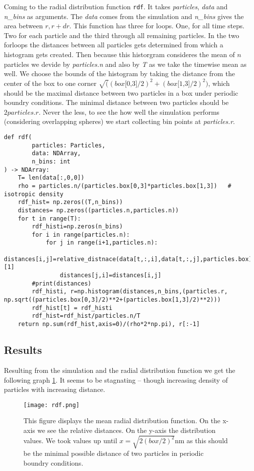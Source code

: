 \documentclass{article}[a4paper]
\begin{document}
Coming to the radial distribution function \texttt{rdf}. 
It takes \textit{particles}, \textit{data} and \textit{n\_bins} as arguments. 
The \textit{data} comes from the simulation and \textit{n\_bins} gives the area between $r, r+dr$. 
This function has three for loops. 
One, for all time steps. 
Two for each particle and the third through all remaining particles.
In the two forloops the distances between all particles gets determined from which a histogram gets created. 
Then because this historgram consideres the mean of $n$ particles we devide by \textit{particles.n} and also by \textit{T} as we take the timewise mean as well. 
We choose the bounds of the histogram by taking the distance from the center of the box to one corner $\sqrt((\textit{box[0,3]}/2)^2+(\textit{box[1,3]}/2)^2)$, which should be the maximal distance between two particles in a box under periodic boundry conditions.
The minimal distance between two particles should be $2\textit{particles.r}$.
Never the less, to see the how well the simulation performs (considering overlapping spheres) we start collecting bin points at \textit{particles.r}.

\begin{lstlisting}
def rdf(
        particles: Particles,
        data: NDArray,
        n_bins: int
) -> NDArray:
    T= len(data[:,0,0])
    rho = particles.n/(particles.box[0,3]*particles.box[1,3])   # isotropic density
    rdf_hist= np.zeros((T,n_bins))
    distances= np.zeros((particles.n,particles.n))
    for t in range(T):
        rdf_histi=np.zeros(n_bins)
        for i in range(particles.n):
            for j in range(i+1,particles.n):
                distances[i,j]=relative_distnace(data[t,:,i],data[t,:,j],particles.box)[1]
                distances[j,i]=distances[i,j]
        #print(distances)
        rdf_histi, r=np.histogram(distances,n_bins,(particles.r, np.sqrt((particles.box[0,3]/2)**2+(particles.box[1,3]/2)**2)))
        rdf_hist[t] = rdf_histi
        rdf_hist=rdf_hist/particles.n/T
    return np.sum(rdf_hist,axis=0)/(rho*2*np.pi), r[:-1]
\end{lstlisting}

\subsection{Results}
Resulting from the simulation and the radial distribution function we get the following graph \ref{fig:rdf}.
It seems to be stagnating -- though increasing density of particles with increasing distance.
\begin{figure}[h!]
    \centering
    \texttt{[image: rdf.png]}
    \caption{This figure displays the mean radial distribution function. On the x-axis we see the relative distances. On the y-axis the distribution values. We took values up until $x=\sqrt{2(\textit{box}/2)^2}$nm as this should be the minimal possible distance of two particles in periodic boundry conditions.} \label{fig:rdf}
\end{figure}
\end{document}
